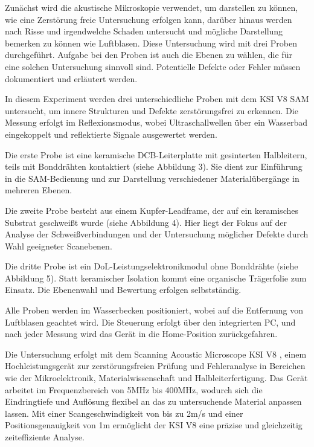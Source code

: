 Zunächst wird die akustische Mikroskopie verwendet, um darstellen zu können, wie eine Zerstörung freie Untersuchung erfolgen kann, darüber hinaus werden nach Risse und irgendwelche Schaden untersucht und mögliche Darstellung bemerken zu können wie Luftblasen. Diese Untersuchung wird mit drei Proben durchgeführt.
Aufgabe bei den Proben ist auch die Ebenen zu wählen, die für eine solchen Untersuchung sinnvoll sind.  Potentielle
Defekte oder Fehler müssen dokumentiert und erläutert werden.


In diesem Experiment werden drei unterschiedliche Proben mit dem KSI V8 SAM untersucht, um innere Strukturen und Defekte zerstörungsfrei zu erkennen. Die Messung erfolgt im Reflexionsmodus, wobei Ultraschallwellen über ein Wasserbad eingekoppelt und reflektierte Signale ausgewertet werden.

Die erste Probe ist eine keramische DCB-Leiterplatte mit gesinterten Halbleitern, teils mit Bonddrähten kontaktiert (siehe Abbildung 3). Sie dient zur Einführung in die SAM-Bedienung und zur Darstellung verschiedener Materialübergänge in mehreren Ebenen.

Die zweite Probe besteht aus einem Kupfer-Leadframe, der auf ein keramisches Substrat geschweißt wurde (siehe Abbildung 4). Hier liegt der Fokus auf der Analyse der Schweißverbindungen und der Untersuchung möglicher Defekte durch Wahl geeigneter Scanebenen.

Die dritte Probe ist ein DoL-Leistungselektronikmodul ohne Bonddrähte (siehe Abbildung 5). Statt keramischer Isolation kommt eine organische Trägerfolie zum Einsatz. Die Ebenenwahl und Bewertung erfolgen selbstständig.

Alle Proben werden im Wasserbecken positioniert, wobei auf die Entfernung von Luftblasen geachtet wird. Die Steuerung erfolgt über den integrierten PC, und nach jeder Messung wird das Gerät in die Home-Position zurückgefahren.



Die Untersuchung erfolgt mit dem Scanning Acoustic Microscope KSI V8 \cite{2}, einem Hochleistungsgerät zur zerstörungsfreien Prüfung und Fehleranalyse in Bereichen wie der Mikroelektronik, Materialwissenschaft und Halbleiterfertigung. Das Gerät arbeitet im Frequenzbereich von 5MHz bis 400MHz, wodurch sich die Eindringtiefe und Auflösung flexibel an das zu untersuchende Material anpassen lassen. Mit einer Scangeschwindigkeit von bis zu 2m/s und einer Positionsgenauigkeit von 1m ermöglicht der KSI V8 eine präzise und gleichzeitig zeiteffiziente Analyse.

